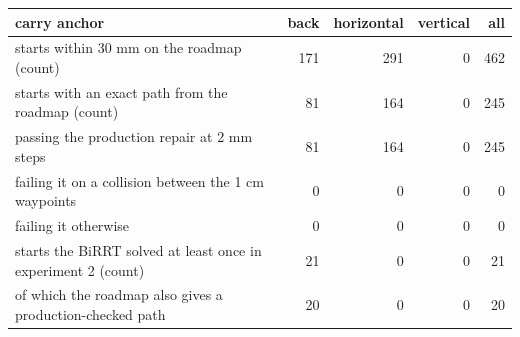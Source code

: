 \begin{tabular}{@{}>{\raggedright\arraybackslash}p{8.0cm} rrrr@{}}
\toprule
carry anchor & back & horizontal & vertical & all \\
\midrule
starts within 30 mm on the roadmap (count) & 171 & 291 & 0 & 462 \\
starts with an exact path from the roadmap (count) & 81 & 164 & 0 & 245 \\
\quad passing the production repair at 2 mm steps & 81 & 164 & 0 & 245 \\
\quad failing it on a collision between the 1 cm waypoints & 0 & 0 & 0 & 0 \\
\quad failing it otherwise & 0 & 0 & 0 & 0 \\
\midrule
starts the BiRRT solved at least once in experiment 2 (count) & 21 & 0 & 0 & 21 \\
\quad of which the roadmap also gives a production-checked path & 20 & 0 & 0 & 20 \\
\bottomrule
\end{tabular}
